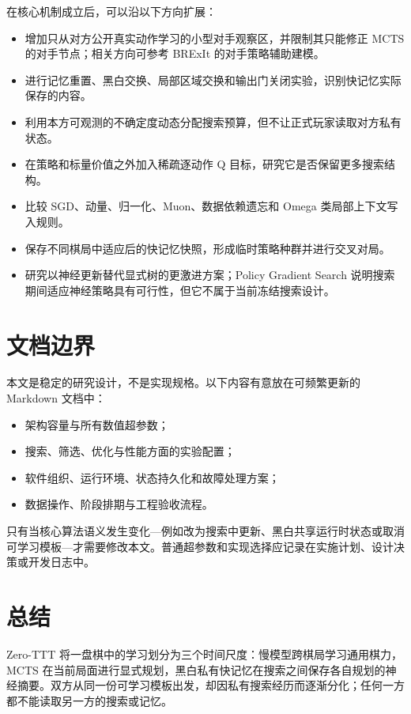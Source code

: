 \documentclass[UTF8,11pt,a4paper]{ctexart}
\newcommand{\projectname}{\textsf{Zero-TTT}}
\begin{document}
在核心机制成立后，可以沿以下方向扩展：

\begin{itemize}
  \item 增加只从对方公开真实动作学习的小型对手观察区，并限制其只能修正 MCTS 的对手节点；相关方向可参考 BRExIt 的对手策略辅助建模\cite{brexit}。
  \item 进行记忆重置、黑白交换、局部区域交换和输出门关闭实验，识别快记忆实际保存的内容。
  \item 利用本方可观测的不确定度动态分配搜索预算，但不让正式玩家读取对方私有状态。
  \item 在策略和标量价值之外加入稀疏逐动作 Q 目标，研究它是否保留更多搜索结构。
  \item 比较 SGD、动量、归一化、Muon、数据依赖遗忘和 Omega 类局部上下文写入规则。
  \item 保存不同棋局中适应后的快记忆快照，形成临时策略种群并进行交叉对局。
  \item 研究以神经更新替代显式树的更激进方案；Policy Gradient Search 说明搜索期间适应神经策略具有可行性，但它不属于当前冻结搜索设计\cite{pgs}。
\end{itemize}

\section{文档边界}

本文是稳定的研究设计，不是实现规格。以下内容有意放在可频繁更新的 Markdown 文档中：

\begin{itemize}
  \item 架构容量与所有数值超参数；
  \item 搜索、筛选、优化与性能方面的实验配置；
  \item 软件组织、运行环境、状态持久化和故障处理方案；
  \item 数据操作、阶段排期与工程验收流程。
\end{itemize}

只有当核心算法语义发生变化---例如改为搜索中更新、黑白共享运行时状态或取消可学习模板---才需要修改本文。普通超参数和实现选择应记录在实施计划、设计决策或开发日志中。

\section{总结}

\projectname{} 将一盘棋中的学习划分为三个时间尺度：慢模型跨棋局学习通用棋力，MCTS 在当前局面进行显式规划，黑白私有快记忆在搜索之间保存各自规划的神经摘要。双方从同一份可学习模板出发，却因私有搜索经历而逐渐分化；任何一方都不能读取另一方的搜索或记忆。
\end{document}
